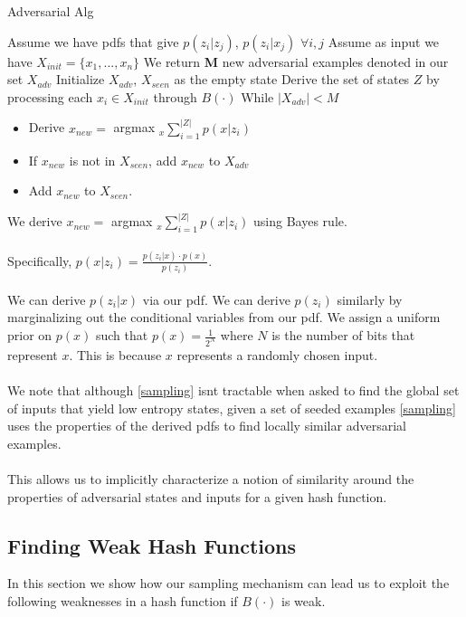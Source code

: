 \begin{algorithm}
\caption{Adversarial Alg}\label{sampling}
\begin{algorithmic}[1]
\State Assume we have pdfs that give $p(z_{i} | z_{j})$, $p(z_{i} | x_{j})$ $\forall i,j$
\State Assume as input we have $X_{init} = \{x_{1}, ..., x_{n}\}$
\State We return \textbf{M} new adversarial examples denoted in our set $X_{adv}$
\State Initialize $X_{adv}$, $X_{seen}$ as the empty state
\State Derive the set of states $Z$ by processing each $x_{i} \in X_{init}$ through $B(\cdot)$
\State While $|X_{adv} | < M$
\begin{itemize}
\item Derive $x_{new} =$ argmax $_{x} \sum_{i=1}^{|Z|} p(x | z_{i})$
\item If $x_{new}$ is not in $X_{seen}$, add $x_{new}$ to $X_{adv}$
\item Add $x_{new}$ to $X_{seen}$.
\end{itemize}
\end{algorithmic}
\end{algorithm}

We derive $x_{new} =$ argmax $_{x} \sum_{i=1}^{|Z|} p(x | z_{i})$ using Bayes rule. 
\\
\\
Specifically, $p(x | z_{i}) = \frac{p(z_{i} | x) \cdot p(x)}{p(z_{i})}$. 
\\
\\
We can derive $p(z_{i} | x)$ via our pdf. We can derive $p(z_{i})$ similarly by marginalizing out the conditional variables from our pdf. We assign a uniform prior on $p(x)$ such that $p(x) = \frac{1}{2^{N}}$ where $N$ is the number of bits that represent $x$. This is because $x$ represents a randomly chosen input.
\\
\\
We note that although \ref{sampling} isnt tractable when asked to find the global set of inputs that yield low entropy states, given a set of seeded examples \ref{sampling} uses the properties of the derived pdfs to find locally similar adversarial examples. 
\\
\\
This allows us to implicitly characterize a notion of similarity around the properties of adversarial states and inputs for a given hash function. 


\subsection{Finding Weak Hash Functions}
In this section we show how our sampling mechanism can lead us to exploit the following weaknesses in a hash function if $B(\cdot)$ is weak.

